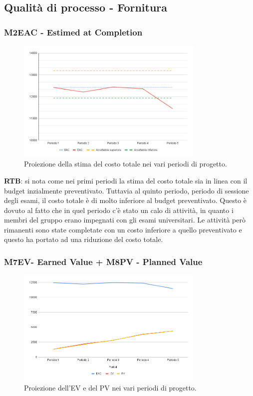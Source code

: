 \subsection{Qualità di processo - Fornitura}

\subsubsection{M2EAC - Estimed at Completion}

\begin{figure}[H]
    \centering
    \includegraphics[width=0.8\textwidth]{../Images/PianoDiQualifica/M2EAC.png}
    \caption{Proiezione della stima del costo totale nei vari periodi di progetto.}
    \label{fig:1}
\end{figure}

\textbf{RTB}: si nota come nei primi periodi la stima del costo totale sia in linea con il budget inzialmente preventivato. Tuttavia al quinto periodo, periodo di sessione degli esami, il costo totale è di molto inferiore al budget preventivato. Questo è dovuto al fatto che in quel periodo c'è stato un calo di attività, in quanto i membri del gruppo erano impegnati con gli esami universitari. Le attività però rimanenti sono state completate con un costo inferiore a quello preventivato e questo ha portato ad una riduzione del costo totale.\\

\subsubsection{M7EV- Earned Value + M8PV - Planned Value} 
\begin{figure}[H]
    \centering
    \includegraphics[width=0.8\textwidth]{../Images/PianoDiQualifica/EV_PV.png}
    \caption{Proiezione dell’EV e del PV nei vari periodi di progetto.}
    \label{fig:2}
\end{figure}

